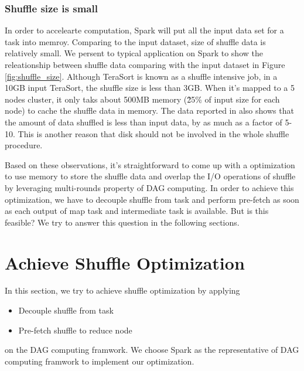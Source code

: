 \documentclass[10pt,twocolumn]{article}
\begin{document}
\subsubsection{Shuffle size is small}\label{shufflesize}
In order to accelearte computation, Spark will put all the input data set for a task into memroy. Comparing to the input dataset, size of shuffle data is relatively small. We persent to typical application on Spark to show the releationship between shuffle data comparing with the input dataset in Figure \ref{fig:shuffle_size}. Although TeraSort\cite{terasort} is known as a shuffle intensive job, in a 10GB input TeraSort, the shuffle size is less than 3GB. When it's mapped to a 5 nodes cluster, it only taks about 500MB memory (\~25\% of input size for each node) to cache the shuffle data in memory. The data reported in \cite{makingsense} also shows that the amount of data shuffled is less than input data, by as much as a factor of 5-10. This is another reason that disk should not be involved in the whole shuffle procedure.


Based on these observations, it's straightforward to come up with a optimization to use memory to store the shuffle data and overlap the I/O operations of shuffle
by leveraging multi-rounds property of DAG computing. In order to achieve this optimization, we have to decouple shuffle from task and 
perform pre-fetch as soon as each output of map task and intermediate task is available. But is this feasible? We try to answer this question
in the following sections.

\section{Achieve Shuffle Optimization}
In this section, we try to achieve shuffle optimization by applying
\begin{itemize}
	\item Decouple shuffle from task
	\item Pre-fetch shuffle to reduce node
\end{itemize}
on the DAG computing framwork.
We choose Spark as the representative of DAG computing framwork to implement our optimization.
\end{document}
